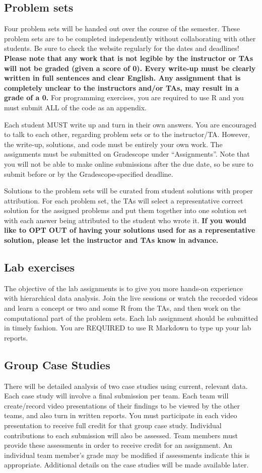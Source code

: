 \documentclass[11pt, a4paper]{article}
\begin{document}
\subsection{Problem sets}
Four problem sets will be handed out over the course of the semester. These problem sets are to be completed independently without collaborating with other students. Be sure to check the website regularly for the dates and deadlines! \textbf{Please note that any work that is not legible by the instructor or TAs will not be graded (given a score  of 0). Every write-up must be clearly written in full sentences and clear English. Any assignment that is completely unclear to the instructors and/or TAs, may result in a grade of a 0.} For programming exercises, you are required to use R and you must submit ALL of the code as an appendix.  

Each student MUST write up and turn in their own answers. You are encouraged to talk to each other, regarding problem sets or to the instructor/TA. However, the write-up, solutions, and code must be entirely your own work. The assignments must be submitted on Gradescope under ``Assignments''. Note that you will not be able to make online submissions after the due date, so be sure to submit before or by the Gradescope-specified deadline.

Solutions to the problem sets will be curated from student solutions with proper attribution. For each problem set, the TAs will select a representative correct solution for the assigned problems and put them together into one solution set with each answer being attributed to the student who wrote it. \textbf{If you would like to OPT OUT of having your solutions used for as a representative solution, please let the instructor and TAs know in advance.}

\subsection{Lab exercises}
The objective of the lab assignments is to give you more hands-on experience with hierarchical data analysis. Join the live sessions or watch the recorded videos and learn a concept or two and some R from the TAs, and then work on the computational part of the problem sets. Each lab assignment should be submitted in timely fashion. You are REQUIRED to use R Markdown to type up your lab reports.

\subsection{Group Case Studies}
There will be detailed analysis of two case studies using current, relevant data. Each case study will involve a final submission per team.
Each team will create/record video presentations of their findings to be viewed by the other teams, and also turn in written reports. You must participate in each video presentation to receive full credit for that group case study. Individual contributions to each submission will also be assessed. Team members must provide these assessments in order to receive credit for an assignment. An individual team member’s grade may be modified if assessments indicate this is appropriate. Additional details on the case studies will be made available later.
\end{document}
